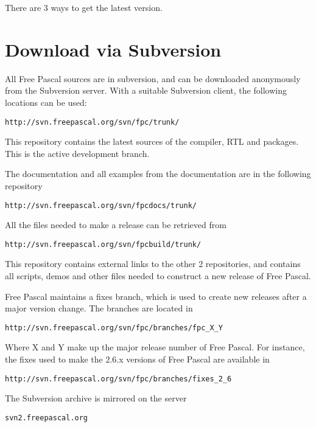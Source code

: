 There are 3 ways to get the latest version.

\section{Download via Subversion}
All Free Pascal sources are in subversion, and can be downloaded anonymously
from the Subversion server. With a suitable Subversion client, the following
locations can be used:
\begin{verbatim}
http://svn.freepascal.org/svn/fpc/trunk/
\end{verbatim}
This repository contains the latest sources of the compiler, RTL and packages.
This is the active development branch.

The documentation and all examples from the documentation are in the
following repository
\begin{verbatim}
http://svn.freepascal.org/svn/fpcdocs/trunk/
\end{verbatim}

All the files needed to make a release can be retrieved from
\begin{verbatim}
http://svn.freepascal.org/svn/fpcbuild/trunk/
\end{verbatim}
This repository contains external links to the other 2 repositories, and
contains all scripts, demos and other files needed to construct a new
release of Free Pascal.

Free Pascal maintains a fixes branch, which is used to create new releases
after a major version change. The branches are located in
\begin{verbatim}
http://svn.freepascal.org/svn/fpc/branches/fpc_X_Y
\end{verbatim}
Where X and Y make up the major release number of Free Pascal.
For instance, the fixes used to make the 2.6.x versions of Free Pascal are
available in
\begin{verbatim}
http://svn.freepascal.org/svn/fpc/branches/fixes_2_6
\end{verbatim}

The Subversion archive is mirrored on the server
\begin{verbatim}
svn2.freepascal.org
\end{verbatim}

